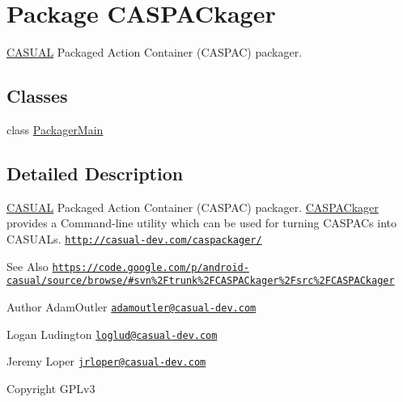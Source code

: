 \hypertarget{namespace_c_a_s_p_a_ckager}{\section{Package C\-A\-S\-P\-A\-Ckager}
\label{namespace_c_a_s_p_a_ckager}
}


\hyperlink{namespace_c_a_s_u_a_l}{C\-A\-S\-U\-A\-L} Packaged Action Container (C\-A\-S\-P\-A\-C) packager.  


\subsection*{Classes}
\begin{DoxyCompactItemize}
\item 
class \hyperlink{class_c_a_s_p_a_ckager_1_1_packager_main}{Packager\-Main}
\end{DoxyCompactItemize}


\subsection{Detailed Description}
\hyperlink{namespace_c_a_s_u_a_l}{C\-A\-S\-U\-A\-L} Packaged Action Container (C\-A\-S\-P\-A\-C) packager. \hyperlink{namespace_c_a_s_p_a_ckager}{C\-A\-S\-P\-A\-Ckager} provides a Command-\/line utility which can be used for turning C\-A\-S\-P\-A\-Cs into C\-A\-S\-U\-A\-Ls. \href{http://casual-dev.com/caspackager/}{\tt http\-://casual-\/dev.\-com/caspackager/} \begin{DoxySeeAlso}{See Also}
\href{https://code.google.com/p/android-casual/source/browse/#svn%2Ftrunk%2FCASPACkager%2Fsrc%2FCASPACkager}{\tt https\-://code.\-google.\-com/p/android-\/casual/source/browse/\#svn\%2\-Ftrunk\%2\-F\-C\-A\-S\-P\-A\-Ckager\%2\-Fsrc\%2\-F\-C\-A\-S\-P\-A\-Ckager} 
\end{DoxySeeAlso}
\begin{DoxyAuthor}{Author}
Adam\-Outler \href{mailto:adamoutler@casual-dev.com}{\tt adamoutler@casual-\/dev.\-com} 

Logan Ludington \href{mailto:loglud@casual-dev.com}{\tt loglud@casual-\/dev.\-com} 

Jeremy Loper \href{mailto:jrloper@casual-dev.com}{\tt jrloper@casual-\/dev.\-com} 
\end{DoxyAuthor}
\begin{DoxyCopyright}{Copyright}
G\-P\-Lv3 
\end{DoxyCopyright}
